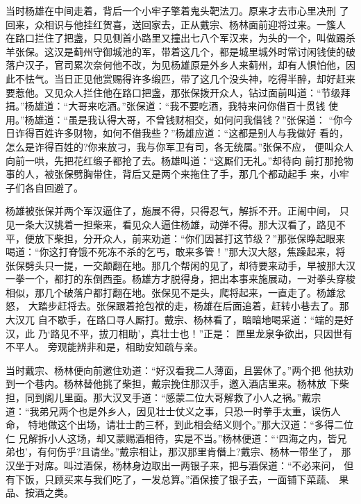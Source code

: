 当时杨雄在中间走着，背后一个小牢子擎着鬼头靶法刀。原来才去市心里决刑
了回来，众相识与他挂红贺喜，送回家去，正从戴宗、杨林面前迎将过来。一簇人
在路口拦住了把盏，只见侧首小路里又撞出七八个军汉来，为头的一个，叫做踢杀
羊张保。这汉是蓟州守御城池的军，带着这几个，都是城里城外时常讨闲钱使的破
落户汉子，官司累次奈何他不改，为见杨雄原是外乡人来蓟州，却有人惧怕他，因
此不怯气。当日正见他赏赐得许多缎匹，带了这几个没头神，吃得半醉，却好赶来
要惹他。又见众人拦住他在路口把盏，那张保拨开众人，钻过面前叫道：“节级拜
揖。”杨雄道：“大哥来吃酒。”张保道：“我不要吃酒，我特来问你借百十贯钱
使用。”杨雄道：“虽是我认得大哥，不曾钱财相交，如何问我借钱？”张保道：
“你今日诈得百姓许多财物，如何不借我些？”杨雄应道：“这都是别人与我做好
看的，怎么是诈得百姓的?你来放刁，我与你军卫有司，各无统属。”张保不应，
便叫众人向前一哄，先把花红缎子都抢了去。杨雄叫道：“这厮们无礼。”却待向
前打那抢物事的人，被张保劈胸带住，背后又是两个来拖住了手，那几个都动起手
来，小牢子们各自回避了。

杨雄被张保并两个军汉逼住了，施展不得，只得忍气，解拆不开。正闹中间，
只见一条大汉挑着一担柴来，看见众人逼住杨雄，动弹不得。那大汉看了，路见不
平，便放下柴担，分开众人，前来劝道：“你们因甚打这节级？”那张保睁起眼来
喝道：“你这打脊饿不死冻不杀的乞丐，敢来多管！”那大汉大怒，焦躁起来，将
张保劈头只一提，一交颠翻在地。那几个帮闲的见了，却待要来动手，早被那大汉
一拳一个，都打的东倒西歪。杨雄方才脱得身，把出本事来施展动，一对拳头穿梭
相似，那几个破落户都打翻在地。张保见不是头，爬将起来，一直走了。杨雄忿怒，
大踏步赶将去。张保跟着抢包袱的走，杨雄在后面追着，赶转小巷去了。那大汉兀
自不歇手，在路口寻人厮打。戴宗、杨林看了，暗暗地喝采道：“端的是好汉，此
乃‘路见不平，拔刀相助’，真壮士也！”正是：
匣里龙泉争欲出，只因世有不平人。
旁观能辨非和是，相助安知疏与亲。

当时戴宗、杨林便向前邀住劝道：“好汉看我二人薄面，且罢休了。”两个把
他扶劝到一个巷内。杨林替他挑了柴担，戴宗挽住那汉手，邀入酒店里来。杨林放
下柴担，同到阁儿里面。那大汉叉手道：“感蒙二位大哥解救了小人之祸。”戴宗
道：“我弟兄两个也是外乡人，因见壮士仗义之事，只恐一时拳手太重，误伤人命，
特地做这个出场，请壮士酌三杯，到此相会结义则个。”那大汉道：“多得二位仁
兄解拆小人这场，却又蒙赐酒相待，实是不当。”杨林便道：“‘四海之内，皆兄
弟也’，有何伤乎?且请坐。”戴宗相让，那汉那里肯僭上?戴宗、杨林一带坐了，
那汉坐于对席。叫过酒保，杨林身边取出一两银子来，把与酒保道：“不必来问，
但有下饭，只顾买来与我们吃了，一发总算。”酒保接了银子去，一面铺下菜蔬、
果品、按酒之类。

